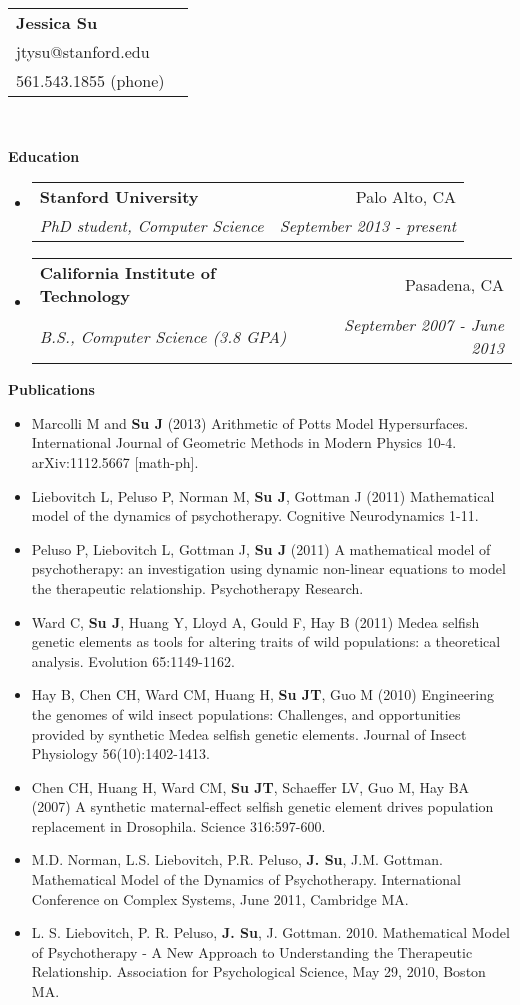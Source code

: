 \documentclass[letterpaper,11pt]{article}
\makeatletter
\newcommand{\resheading}[1]{{\large \colorbox{mygrey}{\begin{minipage}{\textwidth}{\textbf{#1 \vphantom{p\^{E}}}}\end{minipage}}}}
\newcommand{\ressubheading}[4]{
\begin{tabular*}{7.0in}{l@{\extracolsep{\fill}}r}
		\textbf{#1} & #2 \\
		\textit{#3} & \textit{#4}\\
\end{tabular*}\vspace{-6pt}}
\makeatother
\begin{document}
\begin{tabular*}{7.5in}{l@{\extracolsep{\fill}}r}
\textbf{\large Jessica Su}\\
jtysu@stanford.edu\\
561.543.1855 (phone)
\end{tabular*}
\\

\vspace{0.1in}

\resheading{Education}
\begin{itemize}
\item
	\ressubheading{Stanford University}{Palo Alto, CA}{PhD student, Computer Science}{September 2013 - present}
\item
	\ressubheading{California Institute of Technology}{Pasadena, CA}{B.S., Computer Science (3.8 GPA)}{September 2007 - June 2013}

\end{itemize}

\resheading{Publications}
\begin{itemize}
	\item Marcolli M and \textbf{Su J} (2013) Arithmetic of Potts Model Hypersurfaces.  International Journal of Geometric Methods in Modern Physics 10-4.  arXiv:1112.5667 [math-ph].
	\item Liebovitch L, Peluso P, Norman M, \textbf{Su J}, Gottman J (2011) Mathematical model of the dynamics of psychotherapy.  Cognitive Neurodynamics 1-11.
	\item Peluso P, Liebovitch L, Gottman J, \textbf{Su J} (2011) A mathematical model of psychotherapy: an investigation using dynamic non-linear equations to model the therapeutic relationship.  Psychotherapy Research.
	\item Ward C, \textbf{Su J}, Huang Y, Lloyd A, Gould F, Hay B (2011) Medea selfish genetic elements as tools for altering traits of wild populations: a theoretical analysis.  Evolution 65:1149-1162.
	\item Hay B, Chen CH, Ward CM, Huang H, \textbf{Su JT}, Guo M (2010) Engineering the genomes of wild insect populations: Challenges, and opportunities provided by synthetic Medea selfish genetic elements.  Journal of Insect Physiology 56(10):1402-1413.
	\item Chen CH, Huang H, Ward CM, \textbf{Su JT}, Schaeffer LV, Guo M, Hay BA (2007) A synthetic maternal-effect selfish genetic element drives population replacement in Drosophila. Science 316:597-600.
	\item M.D. Norman, L.S. Liebovitch, P.R. Peluso, \textbf{J. Su}, J.M. Gottman.  Mathematical Model of the Dynamics of Psychotherapy.  International Conference on Complex Systems, June 2011, Cambridge MA.
	\item L. S. Liebovitch, P. R. Peluso, \textbf{J. Su}, J. Gottman. 2010. Mathematical Model of Psychotherapy - A New Approach to Understanding the Therapeutic Relationship. Association for Psychological Science, May 29, 2010, Boston MA.
\end{itemize}
\end{document}
